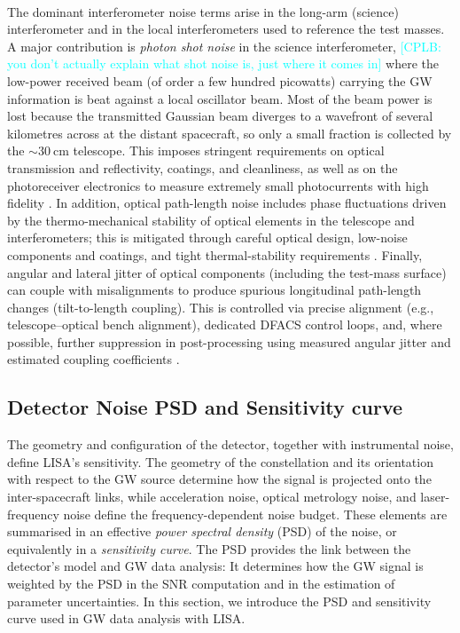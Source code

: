 \documentclass[a4paper,12pt]{article}
\newcommand{\cplb}[1]{\textcolor{cyan}{[CPLB: #1]}}
\begin{document}
\paragraph{}
The dominant interferometer noise terms arise in the long-arm (science) interferometer and in the local interferometers used to reference the test masses. A major contribution is \textit{photon shot noise} in the science interferometer, \cplb{you don't actually explain what shot noise is, just where it comes in} where the low-power received beam (of order a few hundred picowatts) carrying the GW information is beat against a local oscillator beam. Most of the beam power is lost because the transmitted Gaussian beam diverges to a wavefront of several kilometres across at the distant spacecraft, so only a small fraction is collected by the $\sim30~\mathrm{cm}$ telescope. This imposes stringent requirements on optical transmission and reflectivity, coatings, and cleanliness, as well as on the photoreceiver electronics to measure extremely small photocurrents with high fidelity \cite{colpiand2023lisa}. In addition, optical path-length noise includes phase fluctuations driven by the thermo-mechanical stability of optical elements in the telescope and interferometers; this is mitigated through careful optical design, low-noise components and coatings, and tight thermal-stability requirements \cite{colpiand2023lisa}. Finally, angular and lateral jitter of optical components (including the test-mass surface) can couple with misalignments to produce spurious longitudinal path-length changes (tilt-to-length coupling). This is controlled via precise alignment (e.g., telescope–optical bench alignment), dedicated DFACS control loops, and, where possible, further suppression in post-processing using measured angular jitter and estimated coupling coefficients \cite{colpiand2023lisa}.

\subsection{Detector Noise PSD and Sensitivity curve}
\label{subsec:PSD_Sensit}

The geometry and configuration of the detector, together with instrumental noise, define LISA's sensitivity\cite{amaro2017laser}. The geometry of the constellation and its orientation with respect to the GW source determine how the signal is projected onto the inter-spacecraft links, while acceleration noise, optical metrology noise, and laser-frequency noise define the frequency-dependent noise budget. These elements are summarised in an effective \textit{power spectral density} (PSD) of the noise, or equivalently in a \textit{sensitivity curve}\cite{robson2019construction,babak2021lisa}. The PSD provides the link between the detector's model and GW data analysis: It determines how the GW signal is weighted by the PSD in the SNR computation and in the estimation of parameter uncertainties\cite{robson2019construction,babak2021lisa}. In this section, we introduce the PSD and sensitivity curve used in GW data analysis with LISA.
\end{document}
